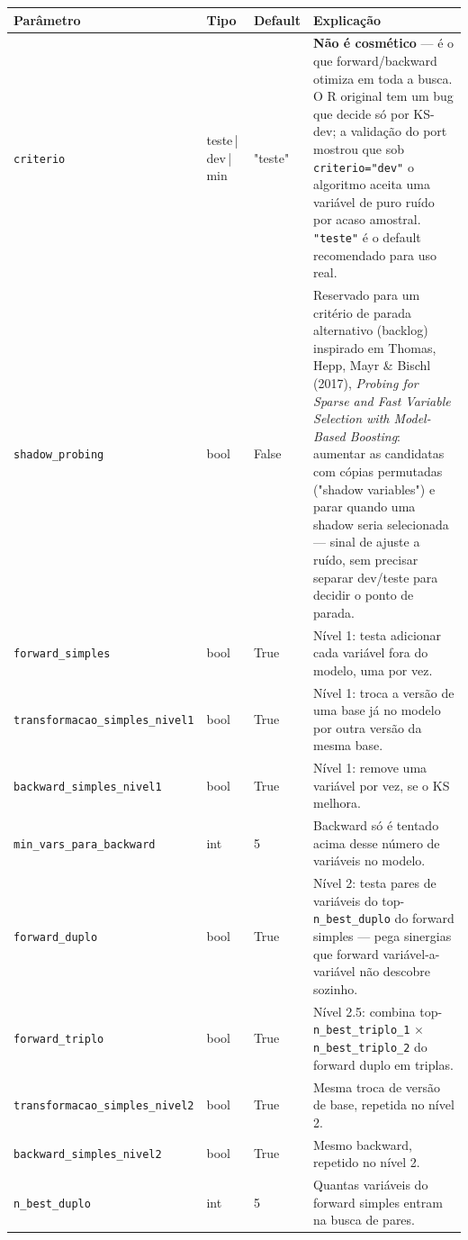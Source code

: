 \documentclass[11pt]{article}
\begin{document}
\begin{longtable}{P{4.3cm}P{1.8cm}P{1.4cm}P{6.2cm}}
\toprule
\textbf{Parâmetro} & \textbf{Tipo} & \textbf{Default} & \textbf{Explicação} \\
\midrule
\endhead
\texttt{criterio} & teste\,|\,dev\,|\,min & "teste" & \textbf{Não é cosmético} --- é o que forward/backward otimiza em toda a busca. O R original tem um bug que decide só por KS-dev; a validação do port mostrou que sob \texttt{criterio="dev"} o algoritmo aceita uma variável de puro ruído por acaso amostral. \texttt{"teste"} é o default recomendado para uso real. \\
\texttt{shadow\_probing} & bool & False & Reservado para um critério de parada alternativo (backlog) inspirado em Thomas, Hepp, Mayr \& Bischl (2017), \emph{Probing for Sparse and Fast Variable Selection with Model-Based Boosting}: aumentar as candidatas com cópias permutadas ("shadow variables") e parar quando uma shadow seria selecionada --- sinal de ajuste a ruído, sem precisar separar dev/teste para decidir o ponto de parada. \\
\texttt{forward\_simples} & bool & True & Nível 1: testa adicionar cada variável fora do modelo, uma por vez. \\
\texttt{transformacao\_simples\_nivel1} & bool & True & Nível 1: troca a versão de uma base já no modelo por outra versão da mesma base. \\
\texttt{backward\_simples\_nivel1} & bool & True & Nível 1: remove uma variável por vez, se o KS melhora. \\
\texttt{min\_vars\_para\_backward} & int & 5 & Backward só é tentado acima desse número de variáveis no modelo. \\
\texttt{forward\_duplo} & bool & True & Nível 2: testa pares de variáveis do top-\texttt{n\_best\_duplo} do forward simples --- pega sinergias que forward variável-a-variável não descobre sozinho. \\
\texttt{forward\_triplo} & bool & True & Nível 2.5: combina top-\texttt{n\_best\_triplo\_1} $\times$ \texttt{n\_best\_triplo\_2} do forward duplo em triplas. \\
\texttt{transformacao\_simples\_nivel2} & bool & True & Mesma troca de versão de base, repetida no nível 2. \\
\texttt{backward\_simples\_nivel2} & bool & True & Mesmo backward, repetido no nível 2. \\
\texttt{n\_best\_duplo} & int & 5 & Quantas variáveis do forward simples entram na busca de pares. \\

\end{longtable}
\end{document}
